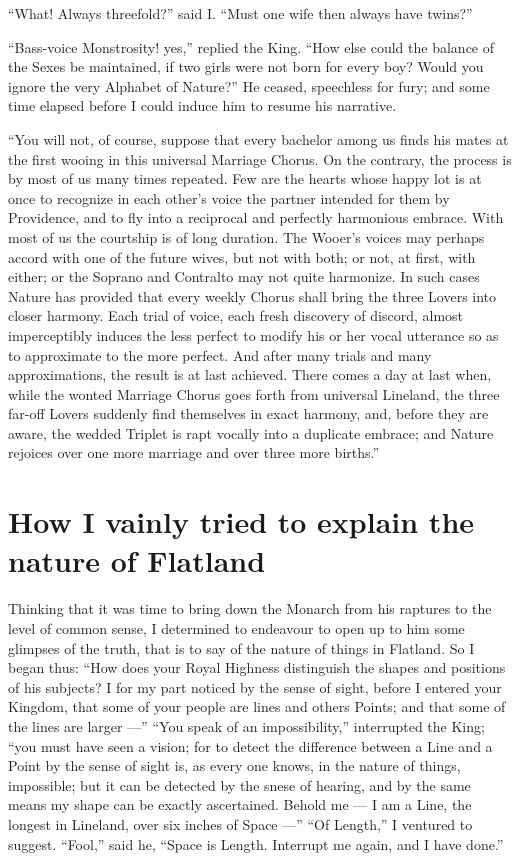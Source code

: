 \documentclass[12pt, a4paper, oneside]{memoir}
\begin{document}
``What! Always threefold?'' said I. ``Must one wife then always have twins?''

``Bass-voice Monstrosity! yes,'' replied the King. ``How else could the balance
of the Sexes be maintained, if two girls were not born for every boy? Would
you ignore the very Alphabet of Nature?'' He ceased, speechless for fury; and
some time elapsed before I could induce him to resume his narrative.

``You will not, of course, suppose that every bachelor among us finds his mates
at the first wooing in this universal Marriage Chorus. On the contrary, the
process is by most of us many times repeated. Few are the hearts whose happy
lot is at once to recognize in each other's voice the partner intended for
them by Providence, and to fly into a reciprocal and perfectly harmonious
embrace. With most of us the courtship is of long duration. The Wooer's voices
may perhaps accord with one of the future wives, but not with both; or not, at
first, with either; or the Soprano and Contralto may not quite harmonize. In
such cases Nature has provided that every weekly Chorus shall bring the three
Lovers into closer harmony. Each trial of voice, each fresh discovery of
discord, almost imperceptibly induces the less perfect to modify his or her
vocal utterance so as to approximate to the more perfect. And after many
trials and many approximations, the result is at last achieved. There comes a
day at last when, while the wonted Marriage Chorus goes forth from universal
Lineland, the three far-off Lovers suddenly find themselves in exact harmony,
and, before they are aware, the wedded Triplet is rapt vocally into a
duplicate embrace; and Nature rejoices over one more marriage and over three
more births.''




\chapter{How I vainly tried to explain the nature of Flatland}
Thinking that it was time to bring down the Monarch from his raptures to the
level of common sense, I determined to endeavour to open up to him some
glimpses of the truth, that is to say of the nature of things in Flatland. So
I began thus: ``How does your Royal Highness distinguish the shapes and
positions of his subjects? I for my part noticed by the sense of sight, before
I entered your Kingdom, that some of your people are lines and others Points;
and that some of the lines are larger ---'' ``You speak of an impossibility,''
interrupted the King; ``you must have seen a vision; for to detect the
difference between a Line and a Point by the sense of sight is, as every one
knows, in the nature of things, impossible; but it can be detected by the
snese of hearing, and by the same means my shape can be exactly ascertained.
Behold me --- I am a Line, the longest in Lineland, over six inches of Space ---''
``Of Length,'' I ventured to suggest. ``Fool,'' said he, ``Space is Length.
Interrupt me again, and I have done.''
\end{document}
